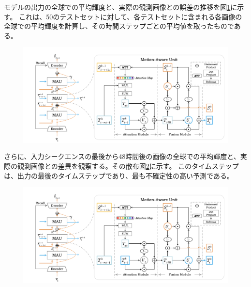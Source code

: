         モデルの出力の全球での平均輝度と、実際の観測画像との誤差の推移を図\ref{fig:exp1_mean_intensity_line}に示す。
        これは、50のテストセットに対して、各テストセットに含まれる各画像の全球での平均輝度を計算し、その時間ステップごとの平均値を取ったものである。
        \begin{figure}[htpb]
          \centering
          \includegraphics[width=\textwidth]{figures/mau.png}
          \caption{}
          \label{fig:exp1_mean_intensity_line}
        \end{figure}
        
        さらに、入力シークエンスの最後から48時間後の画像の全球での平均輝度と、実際の観測画像との差異を観察する。その散布図\ref{fig:exp1_mean_intensity_scatter}に示す。
        このタイムステップは、出力の最後のタイムステップであり、最も不確定性の高い予測である。
        \begin{figure}[htpb]
          \centering
          \includegraphics[width=\textwidth]{figures/mau.png}
          \caption{}
          \label{fig:exp1_mean_intensity_scatter}
        \end{figure}

